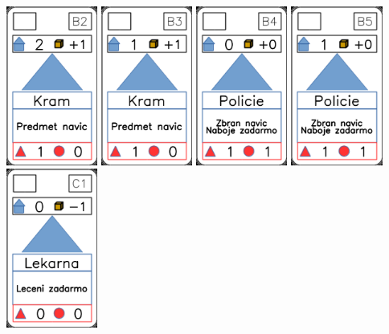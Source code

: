 \documentclass[a4paper]{article}
\begin{document}
	\includegraphics[width=3.0cm]{img-3_6}
	\includegraphics[width=3.0cm]{img-3_7}
	\includegraphics[width=3.0cm]{img-3_8}
	\includegraphics[width=3.0cm]{img-3_9}
	\includegraphics[width=3.0cm]{img-3_10}
\end{document}
